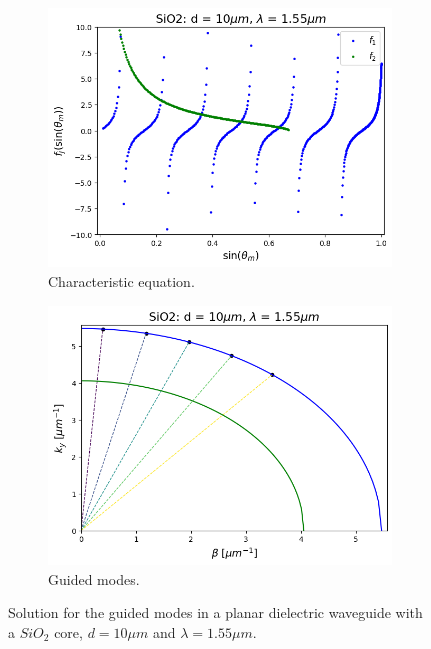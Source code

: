 \documentclass[a4paper,12pt]{article}
\begin{document}
\begin{figure}[H]
    \centering
    \begin{subfigure}{0.45\textwidth}
        \centering
        \includegraphics[scale=0.45]{modes_SiO2_d10um_wv1.55um.png}
        \caption{Characteristic equation.}
        \label{fig:char_eq}
    \end{subfigure}
    \hfill
    \begin{subfigure}{0.45\textwidth}
        \centering
        \includegraphics[scale=0.45]{modeshell_SiO2_d10um_wv1.55um.png}
        \caption{Guided modes.}
        \label{fig:shell_modes}
    \end{subfigure}
    \caption{Solution for the guided modes in a planar dielectric waveguide with a $SiO_2$ core, $d = 10 \mu m$ and $\lambda = 1.55 \mu m$.}
\end{figure}
\end{document}
